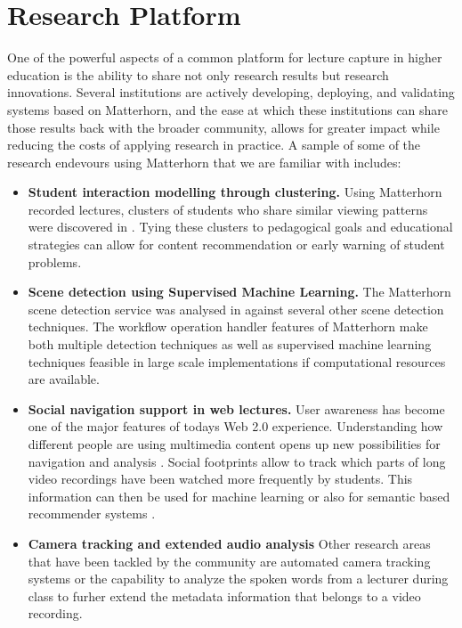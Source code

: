 \documentclass{sig-alternate}
\begin{document}

\section{Research Platform}
One of the powerful aspects of a common platform for lecture capture in higher education is the ability to share not only research results but research innovations.  Several institutions are actively developing, deploying, and validating systems based on Matterhorn, and the ease at which these institutions can share those results back with the broader community, allows for greater impact while reducing the costs of applying research in practice.
A sample of some of the research endevours using Matterhorn that we are familiar with includes:
\begin{itemize}
\item \textbf{Student interaction modelling through clustering.}   Using Matterhorn recorded lectures, clusters of students who share similar viewing patterns were discovered in \cite{Brooks2010}.  Tying these clusters to pedagogical goals and educational strategies can allow for content recommendation or early warning of student problems.
\item \textbf{Scene detection using Supervised Machine Learning.}  The Matterhorn scene detection service was analysed in \cite{Johnston2011} against several other scene detection techniques.  The workflow operation handler features of Matterhorn make both multiple detection techniques as well as supervised machine learning techniques feasible in large scale implementations if computational resources are available.
\item \textbf{Social navigation support in web lectures.} User awareness has become one of the major features of todays Web 2.0 experience. Understanding how different people are using multimedia content opens up new possibilities for navigation and analysis \cite{KMV09}. Social footprints allow to track which parts of long video recordings have been watched more frequently by students. This information can then be used for machine learning or also for semantic based recommender systems \cite{Ketterl:2010:USN:1912600.1912699}.
\item \textbf{Camera tracking and extended audio analysis} Other research areas that have been tackled by the community are automated camera tracking systems or the capability to analyze the spoken words from a lecturer during class to furher extend the metadata information that belongs to a video recording.
\end{itemize}
\end{document}
